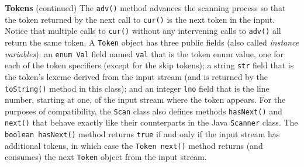\begin{minipage}[t]{\sw}
\slidenumber
\LARGE
{\bf Tokens} (continued)\exx
The \verb'adv()' method advances the scanning process
so that the token returned by the next call to \verb'cur()'
is the next token in the input.
Notice that multiple calls to \verb'cur()'
without any intervening calls to \verb'adv()'
all return the same token.\exx
A \verb'Token' object has three public fields
(also called {\em instance variables}):
an \verb'enum Val' field named \verb'val' that is the token enum value,
one for each of the token specifiers (except for the skip tokens);
a string \verb'str' field that is the token's lexeme derived
from the input stream (and is returned by
the \verb'toString()' method in this class);
and an integer \verb'lno' field that is the line number,
starting at one, of the input stream where the token appears.\exx
For the purposes of compatibility,
the \verb'Scan' class also defines methods \verb'hasNext()' and \verb'next()'
that behave exactly like their counterparts in the Java \verb'Scanner' class.
The \verb'boolean hasNext()' method returns \verb'true'
if and only if the input stream has additional tokens,
in which case the \verb'Token next()' method returns (and consumes)
the next \verb'Token' object from the input stream.\exx

\end{minipage}
